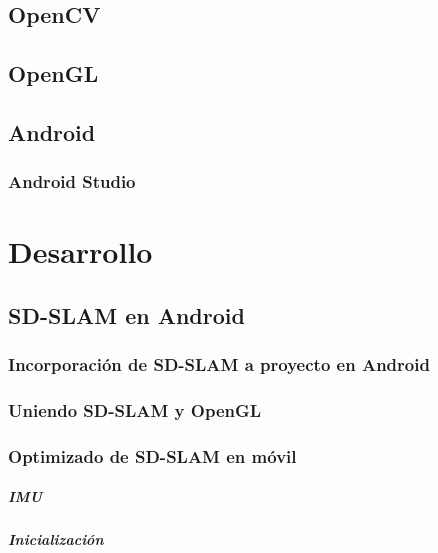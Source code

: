 \documentclass[a4paper, 12pt]{book}
\begin{document}
\section{OpenCV}
\label{sec:opencv}

\section{OpenGL}
\label{sec:opengl}

\section{Android}
\label{sec:android}

\subsection{Android Studio}
\label{subsec:androidstudio}

\chapter{Desarrollo}
\label{sec:desarrollo}

\section{SD-SLAM en Android}
\label{sec:sdslamenandroid}

\subsection{Incorporación de SD-SLAM a proyecto en Android}
\label{subsec:sdslamincorporadoandroid}

\subsection{Uniendo SD-SLAM y OpenGL}
\label{subsec:sdslamyopengl}

\subsection{Optimizado de SD-SLAM en móvil}
\label{subsec:opmizacionsdslammovil}

\paragraph{IMU}
\label{subsec:imu}

\paragraph{Inicialización}
\label{subsec:inicializacion}
\end{document}
